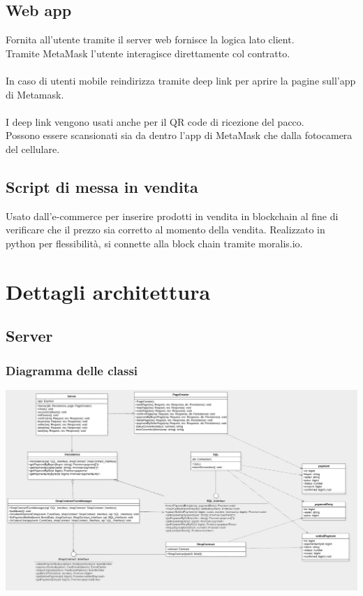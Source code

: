 \documentclass[a4paper, 12pt]{article}
\begin{document}
\subsection{Web app}
Fornita all'utente tramite il server web fornisce la logica lato client.\\
Tramite MetaMask l'utente interagisce direttamente col contratto.\\\\
In caso di utenti mobile reindirizza tramite deep link per aprire la pagine sull'app di Metamask.\\\\
I deep link vengono usati anche per il QR code di ricezione del pacco.\\
Possono essere scansionati sia da dentro l'app di MetaMask che dalla fotocamera del cellulare.

\subsection{Script di messa in vendita}
Usato dall'e-commerce per inserire prodotti in vendita in blockchain al fine di verificare che il prezzo sia corretto al momento della vendita.
Realizzato in python per flessibilità, si connette alla block chain tramite moralis.io.
\newpage
\section{Dettagli architettura}
\subsection{Server}
\subsubsection{Diagramma delle classi}
\includegraphics[width=1.0\textwidth]{server_class}
\end{document}
